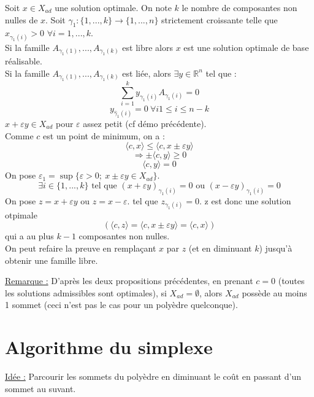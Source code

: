 
\begin{dem}
Soit $x\in X_{ad}$ une solution optimale. On note $k$ le nombre de composantes non nulles de $x$. Soit $\gamma_1:\{1,...,k\}\to \{1,...,n\}$ strictement croissante telle que $x_{\gamma_1(i)}>0$ $\forall i=1,...,k$.\\
Si la famille $A_{\gamma_1(1)},...,A_{\gamma_1(k)}$ est libre alors $x$ est une solution optimale de base réalisable.\\
Si la famille $A_{\gamma_1(1)},...,A_{\gamma_1(k)}$ est liée, alors $\exists y\in\mathbb{R}^n$ tel que :
	\[\sum_{i=1}^k y_{\gamma_1(i)} A_{\gamma_1(i)}=0\]
	\[y_{\hat{\gamma}_1(i)}=0\ \forall i 1\leq i\leq n-k\]
$x+\varepsilon y\in X_{ad}$ pour $\varepsilon$ assez petit (cf démo précédente). \\
Comme $c$ est un point de minimum, on a :
	\[\langle c,x\rangle \leq \langle c, x\pm \varepsilon y\rangle\]
	\[\Rightarrow \pm\langle c, y\rangle \geq 0\]
	\[\langle c,y\rangle=0\]
On pose $\varepsilon_1=\sup\{\varepsilon>0;\ x\pm\varepsilon y\in X_{ad}\}$. 
	\[\exists i\in \{1,...,k\} \text{ tel que } (x+\varepsilon y)_{\gamma_1(i)}=0 \text{ ou } (x-\varepsilon y)_{\gamma_1(i)}=0\]
On pose $z=x+\varepsilon y$ ou $z=x-\varepsilon$. tel que $z_{\gamma_1(i)}=0$. z est donc une solution otpimale 
\[(\langle c,z\rangle=\langle c,x\pm\varepsilon y\rangle = \langle c,x\rangle)\]
qui a au plus $k-1$ composantes non nulles.\\
On peut refaire la preuve en remplaçant $x$ par $z$ (et en diminuant $k$) jusqu'à obtenir une famille libre.
\end{dem}

\underline{Remarque :} D'après les deux propositions précédentes, en prenant $c=0$ (toutes les solutions admissibles sont optimales), si $X_{ad}=\emptyset$, alors $X_{ad}$ possède au moins 1 sommet (ceci n'est pas le cas pour un polyèdre quelconque).

\section{Algorithme du simplexe}
\underline{Idée :} Parcourir les sommets du polyèdre en diminuant le coût en passant d'un sommet au suvant.


